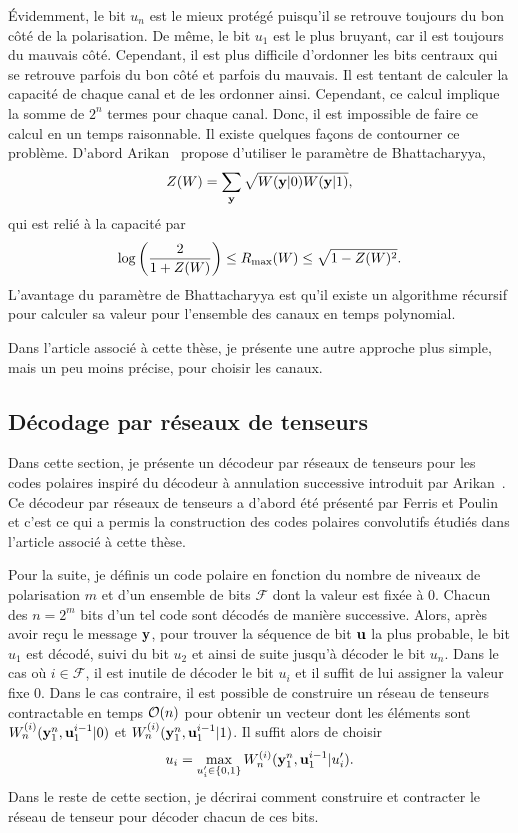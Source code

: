 Évidemment, le bit $u_n$ est le mieux protégé puisqu'il se retrouve
toujours du bon côté de la polarisation. 
De même, 
le bit $u_1$ est le plus bruyant, car il est toujours du mauvais côté.
Cependant, 
il est plus difficile d'ordonner les bits centraux qui se retrouve parfois du bon côté
et parfois du mauvais.
Il est tentant de calculer la capacité de chaque canal et de les ordonner
ainsi.
Cependant, ce calcul implique la somme de $2^n$ termes pour chaque canal. 
Donc, il est impossible de faire ce calcul en un temps raisonnable.
Il existe quelques façons de contourner ce problème.
D'abord Arikan~\cite{arikan_channel_2009} propose d'utiliser le paramètre de Bhattacharyya,
\begin{equation}
  Z(W) = \sum_{\vb y} \sqrt{W(\vb y|0)W(\vb y|1)},
\end{equation}
qui est relié à la capacité par
\begin{equation}
  \log\qty( \frac{2}{1 + Z(W)} )
  \leq  
  R_{\text{max}}(W) 
  \leq 
  \sqrt{1 - Z(W)^2} .
\end{equation}
L'avantage du paramètre de Bhattacharyya est qu'il existe un algorithme récursif pour
calculer sa valeur pour l'ensemble des canaux en temps polynomial.

Dans l'article associé à cette thèse, 
je présente une autre approche plus simple, 
mais un peu moins précise, 
pour choisir les canaux.

\subsection{Décodage par réseaux de tenseurs}

Dans cette section,
je présente un décodeur par réseaux de tenseurs pour les codes polaires 
inspiré du décodeur à annulation successive introduit par Arikan~\cite{arikan_channel_2009}.
Ce décodeur par réseaux de tenseurs a d'abord été présenté par Ferris 
et Poulin~\cite{ferris_branching_2014} et c'est ce qui a permis
la construction des codes polaires convolutifs étudiés dans l'article associé à cette thèse.

Pour la suite, 
je définis un code polaire en fonction du nombre de niveaux de polarisation $m$
et d'un ensemble de bits $\mathcal F$ dont la valeur est fixée à 0.
Chacun des $n = 2^m$ bits d'un tel code sont décodés de manière successive.
Alors, 
après avoir reçu le message $\vb y$,
pour trouver la séquence de bit $\vb u$ la plus probable,
le bit $u_1$ est décodé, suivi du bit $u_2$ et ainsi de suite jusqu'à décoder le bit $u_n$.
Dans le cas où $i \in \mathcal F$, 
il est inutile de décoder le bit $u_i$ et il suffit de lui assigner la valeur fixe $0$.
Dans le cas contraire,
il est possible de construire un réseau de tenseurs contractable en temps $\mathcal{O}(n)$
pour obtenir un vecteur dont les éléments sont $W_n^{(i)}(\vb y_1^n, \vb u_1^{i-1} | 0)$
et $W_n^{(i)}(\vb y_1^n, \vb u_1^{i-1} | 1)$.
Il suffit alors de choisir 
\begin{equation}
  u_i = \max_{u_i' \in \qty{0,1}} W_n^{(i)}(\vb y_1^n, \vb u_1^{i-1} | u_i').
\end{equation}
Dans le reste de cette section,
je décrirai comment construire et contracter le réseau de tenseur
pour décoder chacun de ces bits.

